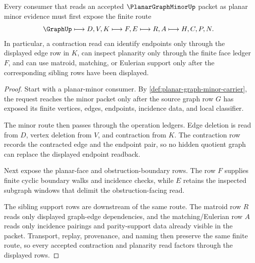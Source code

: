 \begin{theorem}
\label{thm:planar-graph-minor-finite-contraction-route}
Every consumer that reads an accepted $\PlanarGraphMinorUp$ packet as planar minor evidence must first expose the finite route
$$
\GraphUp \longmapsto D,V,K \longmapsto F,E \longmapsto R,A \longmapsto H,C,P,N .
$$
In particular, a contraction read can identify endpoints only through the displayed edge row in $K$, can inspect planarity only through the finite face ledger $F$, and can use matroid, matching, or Eulerian support only after the corresponding sibling rows have been displayed.
\end{theorem}
\begin{proof}
Start with a planar-minor consumer. By \autoref{def:planar-graph-minor-carrier}, the request reaches the minor packet only after the source graph row $G$ has exposed its finite vertices, edges, endpoints, incidence data, and local classifier.

The minor route then passes through the operation ledgers. Edge deletion is read from $D$, vertex deletion from $V$, and contraction from $K$. The contraction row records the contracted edge and the endpoint pair, so no hidden quotient graph can replace the displayed endpoint readback.

Next expose the planar-face and obstruction-boundary rows. The row $F$ supplies finite cyclic boundary walks and incidence checks, while $E$ retains the inspected subgraph windows that delimit the obstruction-facing read.

The sibling support rows are downstream of the same route. The matroid row $R$ reads only displayed graph-edge dependencies, and the matching/Eulerian row $A$ reads only incidence pairings and parity-support data already visible in the packet. Transport, replay, provenance, and naming then preserve the same finite route, so every accepted contraction and planarity read factors through the displayed rows.
\end{proof}


